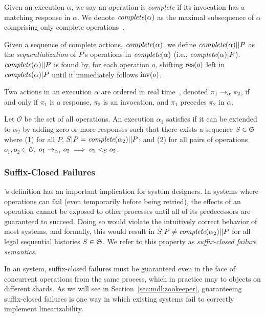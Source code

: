  Given an execution $\alpha$, we say an
operation is \textit{complete} if its invocation has a matching response in
$\alpha$. We denote $\operatorname*{\textit{complete}}(\alpha)$ as the maximal subsequence of $\alpha$
comprising only complete operations~\cite{herlihy1990linearizability}.

 Given a sequence of complete actions,
$\operatorname*{\textit{complete}}(\alpha)$, we define $\operatorname*{\textit{complete}}(\alpha)||P$ as the \textit{sequentialization}
of $P$'s operations in $\operatorname*{\textit{complete}}(\alpha)$ (i.e., $\operatorname*{\textit{complete}}(\alpha)|P$).
$\operatorname*{\textit{complete}}(\alpha)||P$ is found by, for each operation $o$, shifting $\operatorname{res}(o)$ left
in $\operatorname*{\textit{complete}}(\alpha)|P$ until it immediately follows $\operatorname{inv}(o)$.

 Two actions in an execution $\alpha$ are
ordered in real
time~\cite{herlihy1990linearizability}, denoted
$\pi_1 \rightarrow_\alpha \pi_2$, if and only if $\pi_1$ is a response, $\pi_2$ is an
invocation, and $\pi_1$ precedes $\pi_2$ in $\alpha$.

 Let $\mathcal{O}$ be the
set of all operations. An execution $\alpha_1$ satisfies \textit{\MDL{}} if it
can be extended to $\alpha_2$ by adding zero or more responses such that there
exists a sequence $S \in \mathfrak{S}$ where (1) for all $P$,
$S|P = \operatorname*{\textit{complete}}(\alpha_2)||P$; and (2) for all pairs of operations
$o_1,o_2 \in \mathcal{O}$, $o_1 \rightarrow_{\alpha_1} o_2 \implies o_1 <_S o_2$.

\subsubsection{Suffix-Closed Failures}
\label{sec:mdl:def:failures}

\MDL{}'s definition has an important implication for system designers.
In systems where operations can fail (even temporarily before being retried), the effects
of an operation cannot be exposed to other processes until all of its predecessors are
guaranteed to succeed. Doing so would violate the intuitively correct behavior of most
systems, and formally, this would result in $S|P \neq \operatorname*{\textit{complete}}(\alpha_2)||P$ for all legal
sequential histories $S \in \mathfrak{S}$. We refer to this property as
\textit{suffix-closed failure semantics}.

In an \MDL{} system, suffix-closed failures must be guaranteed even in the
face of concurrent operations from the same process, which in practice may to
objects on different shards. As we will see in Section~\ref{sec:mdl:zookeeper},
guaranteeing suffix-closed failures is one way in which existing systems fail
to correctly implement \multidispatch{} linearizability.  

